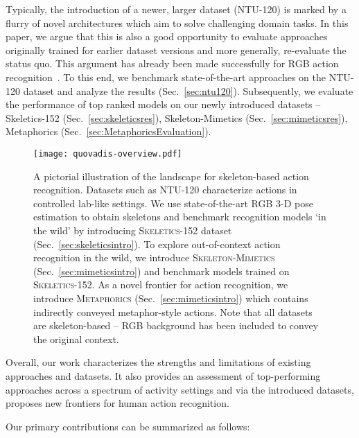 \documentclass[twocolumn]{svjour3}          \smartqed  \usepackage{graphicx}
\begin{document}
Typically, the introduction of a newer, larger dataset (NTU-120) is marked by a flurry of novel architectures which aim to solve challenging domain tasks. In this paper, we argue that this is also a good opportunity to evaluate approaches originally trained for earlier dataset versions and more generally, re-evaluate the status quo. This argument has already been made successfully for RGB action recognition~\cite{sigurdsson2017actions}. To this end, we benchmark state-of-the-art approaches on the NTU-120 dataset and analyze the results (Sec.~\ref{sec:ntu120}). Subsequently, we evaluate the performance of top ranked models on our newly introduced datasets -- Skeletics-152 (Sec.~\ref{sec:skeleticsres}), Skeleton-Mimetics (Sec.~\ref{sec:mimeticsres}), Metaphorics (Sec.~\ref{sec:MetaphoricsEvaluation}). 
 
 \begin{figure*}[!ht]
    \centering
    \texttt{[image: quovadis-overview.pdf]}
    \caption{A pictorial illustration of the landscape for skeleton-based action recognition. Datasets such as \textsc{NTU-120} characterize actions in controlled lab-like settings. We use state-of-the-art RGB 3-D pose estimation to obtain skeletons and benchmark recognition models `in the wild' by introducing \textsc{Skeletics-152} dataset (Sec.~\ref{sec:skeleticsintro}). To explore out-of-context action recognition in the wild, we introduce \textsc{Skeleton-Mimetics} (Sec.~\ref{sec:mimeticsintro}) and benchmark models trained on \textsc{Skeletics-152}. As a novel frontier for action recognition, we introduce \textsc{Metaphorics} (Sec.~\ref{sec:mimeticsintro}) which contains indirectly conveyed metaphor-style actions. Note that all datasets are skeleton-based -- RGB background has been included to convey the original context.}
    \label{fig:qv-overview}
\end{figure*}

Overall, our work characterizes the strengths and limitations of existing approaches and datasets. It also provides an assessment of top-performing approaches across a spectrum of activity settings and via the introduced datasets, proposes new frontiers for human action recognition.

Our primary contributions can be summarized as follows:
\end{document}
